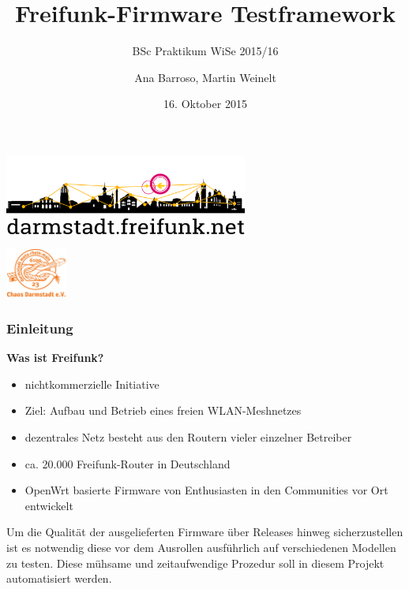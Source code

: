 \documentclass[accentcolor=tud6b,colorbacktitle,inverttitle,landscape,german,presentation,t]{tudbeamer}
\begin{document}
	
	\title[Freifunk-Firmware Testframework]{Freifunk-Firmware Testframework}
	\subtitle{BSc Praktikum WiSe 2015/16}
	
	\author{Ana Barroso, Martin Weinelt}


	\date{16. Oktober 2015}
	
	\begin{titleframe}
		\begin{center}
			\vspace{1cm}
			\includegraphics[width=0.6\textwidth]{images/logo-skyline-text-below}
			\vspace{1.4cm}
		\end{center}
			\flushright
			\includegraphics[width=0.15\textwidth]{images/cda}
	\end{titleframe}
	
	\begin{frame}
		\frametitle{Einleitung}
		\vfill
		\textbf{Was ist Freifunk?}
		\vfill
		\begin{itemize}
			\item nichtkommerzielle Initiative
			\item Ziel: Aufbau und Betrieb eines freien WLAN-Meshnetzes
			\item dezentrales Netz besteht aus den Routern vieler einzelner Betreiber
			\item ca. 20.000 Freifunk-Router in Deutschland
			\item OpenWrt basierte Firmware von Enthusiasten in den Communities vor Ort entwickelt
		\end{itemize}
		\vfill
		\pause
		Um die Qualität der ausgelieferten Firmware über Releases hinweg sicherzustellen ist es notwendig diese vor dem Ausrollen ausführlich auf verschiedenen Modellen zu testen. Diese mühsame und zeitaufwendige Prozedur soll in diesem Projekt automatisiert werden.
	\end{frame}
	
\end{document}
